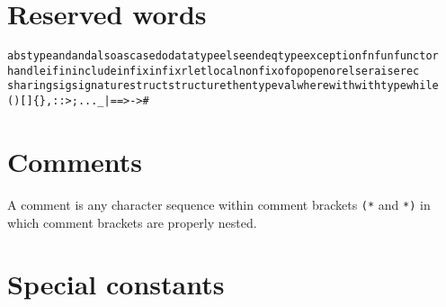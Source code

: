 \documentclass[fleqn,a4paper]{article}
\newcounter{extension}
\begin{document}

\section{Reserved words}
\label{sec-reserved-words}


{\small\begin{alltt} 
abstype  and  andalso  as  case  do  datatype  else  end eqtype exception  fn  fun  functor 
handle  if  in  include  infix  infixr  let  local  nonfix  of  op  open  orelse  raise  rec  
sharing  sig  signature  struct  structure  then  type  val  where  with  withtype  while  
(  )  [  ]  \{  \}  ,  :  :>  ;  ...    _  |  =  =>  ->  #
\end{alltt}}


\section{Comments}
\label{sec-comments}

A comment is any character sequence within comment brackets \verb#(*#
and \verb#*)# in which comment brackets are properly nested.


\section{Special constants}
\label{sec-special-constants}
\end{document}
